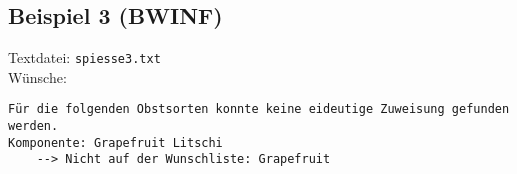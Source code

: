 \subsection{Beispiel 3 (BWINF)}\label{example:3}
Textdatei: \texttt{spiesse3.txt}\\

\noindent
Wünsche: \\

\noindent
{}
\begin{verbatim}
Für die folgenden Obstsorten konnte keine eideutige Zuweisung gefunden werden.
Komponente: Grapefruit Litschi 
	--> Nicht auf der Wunschliste: Grapefruit 
\end{verbatim}
